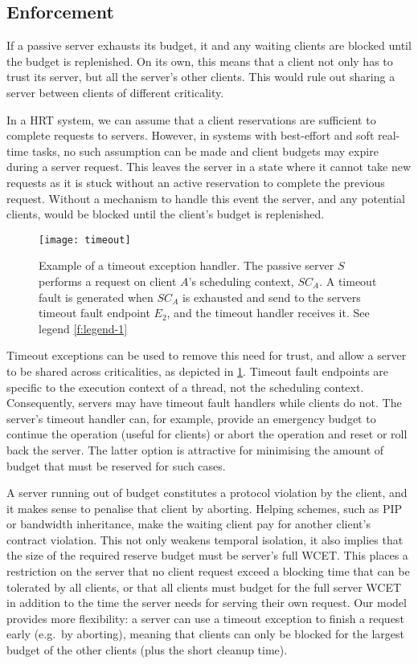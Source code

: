 \subsection{Enforcement}

If a passive server exhausts its budget, it and any waiting clients
are blocked until the budget is replenished. On its own, this means that a client
not only has to trust its server, but all the server's other
clients. This would rule out sharing a server between clients of
different criticality.

In a \gls{HRT} system, we can assume that a client reservations are sufficient to complete
requests to servers.  However, in systems with best-effort and soft real-time tasks, no such
assumption can be made and client budgets may expire during a server request.  This leaves the
server in a state where it cannot take new requests as it is stuck without an active reservation to
complete the previous request.  Without a mechanism to handle this event the server, and any
potential clients, would be blocked until the client's budget is replenished.

\begin{figure}
    \centering
    \texttt{[image: timeout]}
    \caption{Example of a timeout exception handler. The passive server $S$ performs a request on
    client $A$'s scheduling context, $SC_{A}$. A timeout fault is generated when $SC_{A}$ is
exhausted and send to the servers timeout fault endpoint $E_{2}$, and the timeout handler receives it. See legend \cref{f:legend-1}}
    \label{f:timeout}
\end{figure}

Timeout exceptions can be used to remove this need for trust, and
allow a server to be shared across criticalities, as depicted in \cref{f:timeout}. Timeout fault endpoints are specific to the
execution context of a thread, not the scheduling context. Consequently, servers may have timeout
fault handlers while clients do not. The 
server's timeout handler can, for example, provide an emergency budget
to continue the operation (useful for  clients) or abort
the operation and reset or roll back the server. The latter option is
attractive for minimising the amount of budget that must be reserved
for such cases.

A server running out of budget constitutes a protocol violation
by the client, and it makes sense to penalise that
client by aborting. Helping schemes, such as PIP or bandwidth
inheritance,
make the waiting client pay for
another client's contract violation. This not only weakens temporal isolation,
it also implies that the size of the required reserve budget
must be server's full WCET. This places a restriction on the server
that no client request exceed a blocking time that can be tolerated by
all clients, or that all clients must budget for the full server WCET in
addition to the time the server needs for serving their own request.
Our model provides more flexibility: a server can use a timeout
exception to finish a request early (e.g.\ by aborting), meaning that clients can only be
blocked for the largest budget of the other clients (plus the short
cleanup time).

